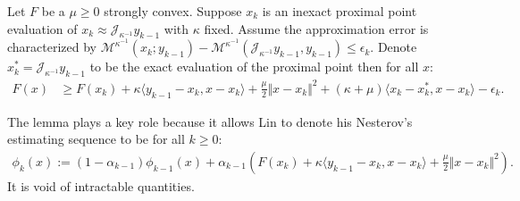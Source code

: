 \documentclass[12pt]{article}
\begin{document}
    \begin{lemma}
        Let $F$ be a $\mu\ge 0$ strongly convex.
        Suppose $x_k$ is an inexact proximal point evaluation of $x_k \approx \mathcal J_{\kappa^{-1}} y_{k - 1}$ with $\kappa$ fixed. 
        Assume the approximation error is characterized by $\mathcal M^{\kappa^{-1}}(x_k; y_{k - 1}) - \mathcal M^{\kappa^{-1}}(\mathcal J_{\kappa^{-1}} y_{k - 1}, y_{k - 1}) \le \epsilon_k$. 
        Denote $x_k^* = \mathcal J_{\kappa^{-1}} y_{k - 1}$ to be the exact evaluation of the proximal point then for all $x$: 
        \begin{align*}
            F(x) &\ge 
            F(x_k) + \kappa \langle y_{k - 1} - x_k, x - x_k\rangle
            + \frac{\mu}{2}\Vert x - x_k\Vert^2 
            + (\kappa + \mu)\langle  x_k - x_k^*, x - x_k\rangle 
            - \epsilon_k.
        \end{align*}
    \end{lemma}
    \begin{remark}
        The lemma plays a key role because it allows Lin to denote his Nesterov's estimating sequence to be for all $k \ge0$: 
        \begin{align*}
            \phi_k(x) := 
            (1 - \alpha_{k - 1})\phi_{k - 1}(x)
            + \alpha_{k - 1}\left(
                F(x_k) + \kappa\langle y_{k - 1} - x_k, x - x_k \rangle
                + \frac{\mu}{2}\Vert x - x_k\Vert^2
            \right). 
        \end{align*}
        It is void of intractable quantities. 
    \end{remark}
    
\end{document}
